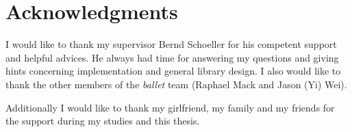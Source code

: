\chapter*{Acknowledgments}
\label{sec:Acknowledgments}

I would like to thank my supervisor Bernd Schoeller for his competent support and helpful advices. He always had time for answering my questions and giving hints concerning implementation and general library design. I also would like to thank the other members of the \emph{ballet} team (Raphael Mack and Jason (Yi) Wei).

Additionally I would like to thank my girlfriend, my family and my friends for the support during my studies and this thesis.
